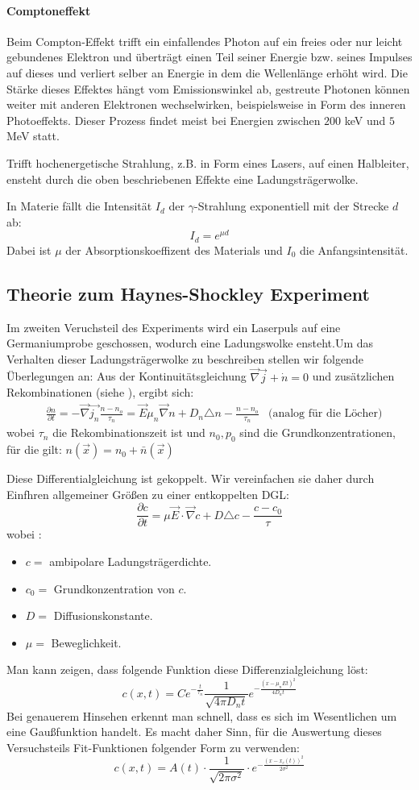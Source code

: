 \documentclass[12pt]{article}
\newcommand{\nab}{\vec{\nabla}} %
\begin{document}
\paragraph{Comptoneffekt} Beim Compton-Effekt trifft ein einfallendes Photon auf ein freies oder nur leicht gebundenes Elektron und überträgt einen Teil seiner Energie bzw. seines Impulses auf dieses und verliert selber an Energie in dem die Wellenlänge erhöht wird. Die Stärke dieses Effektes hängt vom Emissionswinkel ab, gestreute Photonen können weiter mit anderen Elektronen wechselwirken, beispielsweise in Form des inneren Photoeffekts. Dieser Prozess findet meist bei Energien zwischen $200$ keV und $5$ MeV statt.

Trifft hochenergetische Strahlung, z.B. in Form eines Lasers, auf einen Halbleiter, ensteht durch die oben beschriebenen Effekte eine Ladungsträgerwolke.

In Materie fällt die Intensität $I_d$ der $\gamma$-Strahlung exponentiell mit der Strecke $d$ ab:
\[I_d=e^{\mu d}\]
Dabei ist $\mu$ der Absorptionskoeffizent des Materials und $I_0$ die Anfangsintensität.

\subsection{Theorie zum Haynes-Shockley Experiment}

Im zweiten Veruchsteil des Experiments wird ein Laserpuls auf eine Germaniumprobe geschossen, wodurch eine Ladungswolke ensteht.Um das Verhalten dieser Ladungsträgerwolke zu beschreiben stellen wir folgende Überlegungen an: Aus der Kontinuitätsgleichung $\vec{\nabla}\vec{j}+\dot{n}=0$ und zusätzlichen Rekombinationen (siehe \cite{staat}), ergibt sich:
\begin{align*}
&\frac{\partial n}{\partial t}=-\vec{\nabla}\vec{j_n}\frac{n-n_o}{\tau_n}=\vec{E}\mu_n\vec{\nabla}n+D_n\triangle n-\frac{n-n_o}{\tau_n}&\mbox{(analog für die Löcher)}
\end{align*}
wobei  $\tau_n$ die  Rekombinationszeit ist und $n_0,p_0$ sind die Grundkonzentrationen, für die gilt: $n(\vec{x})=n_0+\bar{n}(\vec{x})$

Diese Differentialgleichung ist gekoppelt. Wir vereinfachen sie daher durch Einfhren allgemeiner Größen zu einer entkoppelten DGL:
\[\frac{\partial c}{\partial t}=\mu\vec{E}\cdot\nab c+D\triangle c-\frac{c-c_0}{\tau}\]
wobei :
\begin{itemize}
	\item $c=$  ambipolare Ladungsträgerdichte.
	\item $c_0=$  Grundkonzentration von $c$.
	\item $D=$  Diffusionskonstante.
	\item $\mu=$ Beweglichkeit.
\end{itemize}
Man kann zeigen, dass folgende Funktion diese Differenzialgleichung löst:
\[c(x,t)=Ce^{-\frac{t}{\tau_n}}\frac{1}{\sqrt{4\pi D_n t}}e^{-\frac{(x-\mu_n E t)^2}{4D_n t}}\]
Bei genauerem Hinsehen erkennt man schnell, dass es sich im Wesentlichen um eine Gaußfunktion handelt. Es macht daher Sinn, für die Auswertung dieses Versuchsteils Fit-Funktionen folgender Form zu verwenden:
\[c(x,t)=A(t)\cdot\frac{1}{\sqrt{2\pi\sigma^2}}\cdot e^{-\frac{(x-x_c(t))^2}{2\sigma^2}}\]
\end{document}
